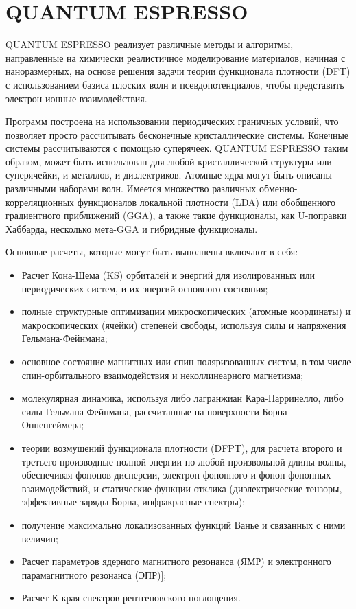 \section{QUANTUM ESPRESSO}
QUANTUM ESPRESSO реализует различные методы и алгоритмы, направленные на химически реалистичное моделирование материалов, начиная с наноразмерных, на основе решения задачи теории функционала плотности (DFT) с использованием базиса плоских волн и псевдопотенциалов, чтобы представить электрон-ионные взаимодействия.

Программ построена на использовании периодических граничных условий, что позволяет просто рассчитывать бесконечные кристаллические системы. Конечные системы рассчитываются с помощью суперячеек. QUANTUM ESPRESSO таким образом, может быть использован для любой кристаллической структуры или суперячейки, и металлов, и диэлектриков. Атомные ядра могут быть описаны различными наборами волн. Имеется множество различных обменно-корреляционных функционалов локальной плотности (LDA) или обобщенного градиентного приближений (GGA), а также такие функционалы, как U-поправки Хаббарда, несколько мета-GGA и гибридные функционалы.

Основные расчеты, которые могут быть выполнены включают в себя\cite{qe}:
\begin{itemize}
    \item Расчет Кона-Шема (KS) орбиталей и энергий для изолированных или периодических систем, и их энергий основного состояния;
    \item полные структурные оптимизации микроскопических (атомные координаты) и макроскопических (ячейки) степеней свободы, используя силы и напряжения Гельмана-Фейнмана;
    \item основное состояние магнитных или спин-поляризованных систем, в том числе спин-орбитального взаимодействия и неколлинеарного магнетизма;
    \item молекулярная динамика, используя либо лагранжиан Кара-Парринелло, либо силы Гельмана-Фейнмана, рассчитанные на поверхности Борна-Оппенгеймера;
    \item теории возмущений функционала плотности (DFPT), для расчета второго и третьего производные полной энергии по любой произвольной длины волны, обеспечивая фононов дисперсии, электрон-фононного и фонон-фононных взаимодействий, и статические функции отклика (диэлектрические тензоры, эффективные заряды Борна, инфракрасные спектры);
    \item получение максимально локализованных функций Ванье  и связанных с ними величин;
    \item Расчет параметров ядерного магнитного резонанса (ЯМР) и электронного парамагнитного резонанса (ЭПР)];
    \item Расчет К-края спектров рентгеновского поглощения.
\end{itemize}
